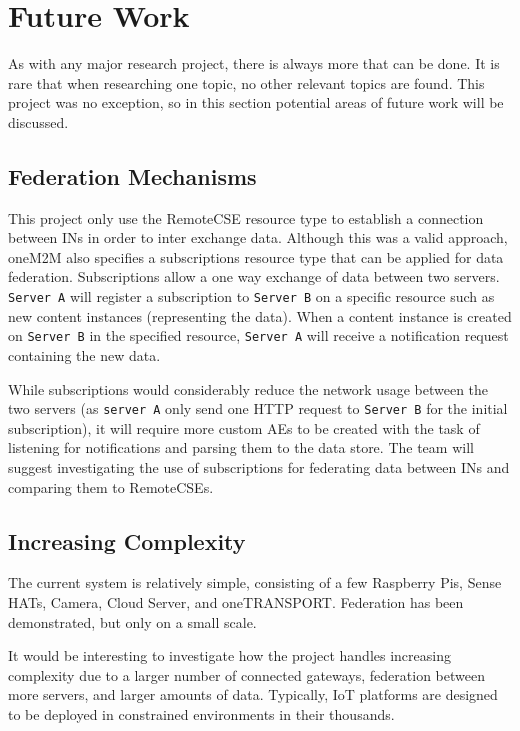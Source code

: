 \chapter{Future Work}

As with any major research project, there is always more that can be done. It is rare that when researching one topic, no other relevant topics are found. This project was no exception, so in this section potential areas of future work will be discussed.


\section{Federation Mechanisms}
\label{sec:sub}

This project only use the RemoteCSE resource type to establish a connection between INs in order to inter exchange data. Although this was a valid approach, oneM2M also specifies a subscriptions resource type that can be applied for data federation. Subscriptions allow a one way exchange of data between two servers. \lstinline{Server A} will register a subscription to \lstinline{Server B} on a specific resource such as new content instances (representing the data). When a content instance is created on \lstinline{Server B} in the specified resource, \lstinline{Server A} will receive a notification request containing the new data.

While subscriptions would considerably reduce the network usage between the two servers (as \lstinline{server A} only send one HTTP request to \lstinline{Server B} for the initial subscription), it will require more custom AEs to be created with the task of listening for notifications and parsing them to the data store. The team will suggest investigating the use of subscriptions for federating data between INs and comparing them to RemoteCSEs. 

\section{Increasing Complexity}

The current system is relatively simple, consisting of a few Raspberry Pis, Sense HATs, Camera, Cloud Server, and oneTRANSPORT. Federation has been demonstrated, but only on a small scale.

It would be interesting to investigate how the project handles increasing complexity due to a larger number of connected gateways, federation between more servers, and larger amounts of data. Typically, IoT platforms are designed to be deployed in constrained environments in their thousands.

